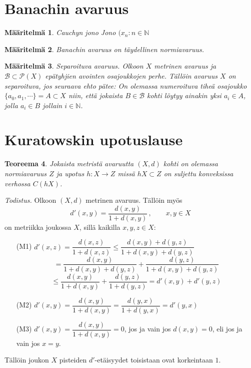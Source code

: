 \documentclass[12pt,a4paper,reqno]{amsart}
\newcommand{\N}{\mathbb{N}}
\newtheorem{maar}{Määritelmä}[section]
\newtheorem{teoreema}[maar]{Teoreema}
\begin{document}


\newpage
\section{Banachin avaruus}

\begin{maar}Cauchyn jono \emph{
Jono $(x_n\colon n\in \N$
}
\end{maar}

\begin{maar}Banachin avaruus on täydellinen normiavaruus.
\end{maar}

\begin{maar}Separoituva avaruus. \emph{Olkoon $X$ metrinen avaruus ja $\mathcal{B}\subset \mathcal{P}( X)$ epätyhjien avointen osajoukkojen perhe. Tällöin avaruus $X$ on separoituva, jos seuraava ehto pätee: On olemassa numeroituva tiheä osajoukko $\{a_0,a_1,\cdots\}=A\subset X$ niin, että jokaista $B\in\mathcal{B}$ kohti löytyy ainakin yksi $a_i\in A$, jolla $a_i\in B$ jollain $i\in \N$.}
\end{maar}


\newpage
\section{Kuratowskin upotuslause}
\noindent 
\begin{teoreema}
Jokaista metristä avaruutta $(X,d)$ kohti on olemassa normiavaruus $Z$ ja upotus $h\colon X\rightarrow Z$ missä $ hX\subset Z$ on suljettu konveksissa verhossa $C(hX)$. 
\end{teoreema} 
 
\vspace{0.5cm}

\noindent\emph{Todistus.} Olkoon $(X,d)$ metrinen avaruus. Tällöin myös
$$d'(x,y)=\dfrac{d(x,y)}{1+d(x,y)} \, , \qquad x,y\in X$$
on metriikka joukossa $X$, sillä kaikilla $x,y,z\in X$:
\begin{itemize}
\item[(M1)]$d'(x,z)=\dfrac{d(x,z)}{1+d(x,z)}\leq \dfrac{d(x,y)+d(y,z)}{1+d(x,y)+d(y,z)}$
$$= \dfrac{d(x,y)}{1+d(x,y)+d(y,z)}+ \dfrac{d(y,z)}{1+d(x,y)+d(y,z)}$$
$$\leq \dfrac{d(x,y)}{1+d(x,y)}+ \dfrac{d(y,z)}{1+d(y,z)}=d'(x,y)+d'(y,z)$$
\item[(M2)]$d'(x,y)=\dfrac{d(x,y)}{1+d(x,y)}=\dfrac{d(y,x)}{1+d(y,x)}=d'(y,x)$
\item[(M3)]$d'(x,y)=\dfrac{d(x,y)}{1+d(x,y)}=0$, jos ja vain jos $d(x,y)=0$, eli jos ja vain jos $x=y$.
\end{itemize} 
Tällöin joukon $X$ pisteiden $d'$-etäisyydet toisistaan ovat korkeintaan $1$.
\end{document}

